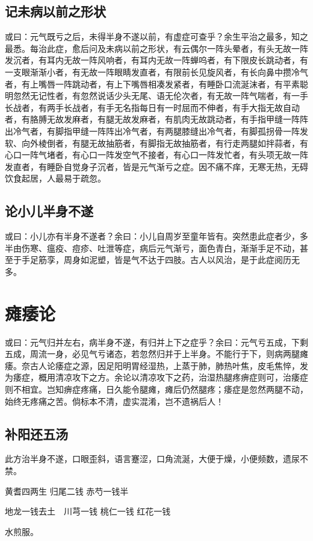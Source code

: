 \documentclass[a4paper,12pt,UTF8,twoside]{ctexbook}
\begin{document}
	\section{记未病以前之形状}
	或曰：元气既亏之后，未得半身不遂以前，有虚症可查乎？余生平治之最多，知之最悉。每治此症，愈后问及未病以前之形状，有云偶尔一阵头晕者，有头无故一阵发沉者，有耳内无故一阵风响者，有耳内无故一阵蝉呜者，有下限皮长跳动者，有一支眼渐渐小者，有无故一阵眼睛发直者，有限前长见旋风者，有长向鼻中攒冷气者，有上嘴唇一阵跳动者，有上下嘴唇相凑发紧者，有睡卧口流涎沫者，有平素聪明忽然无记性者，有忽然说话少头无尾、语无伦次者，有无故一阵气喘者，有一手长战者，有两手长战者，有手无名指每日有一时屈而不伸者，有手大指无故自动者，有胳膊无故发麻者，有腿无故发麻者，有肌肉无故跳动者，有手指甲缝一阵阵出冷气者，有脚指甲缝一阵阵出冷气者，有两腿膝缝出冷气者，有脚孤拐骨一阵发软、向外棱倒者，有腿无故抽筋者，有脚指无故抽筋者，有行走两腿如拌蒜者，有心口一阵气堵者，有心口一阵发空气不接者，有心口一阵发忙者，有头项无故一阵发直者，有睡卧自觉身子沉者，皆是元气渐亏之症。因不痛不痒，无寒无热，无碍饮食起居，人最易于疏忽。
	\section{论小儿半身不遂}
	或曰：小儿亦有半身不遂者？余曰：小儿自周岁至童年皆有。突然患此症者少，多半由伤寒、瘟疫、痘疹、吐泄等症，病后元气渐亏，面色青白，渐渐手足不动，甚至于手足筋孪，周身如泥塑，皆是气不达于四肢。古人以风治，是于此症阅历无多。
	\chapter{瘫痿论}
	或曰：元气归并左右，病半身不遂，有归并上下之症乎？余曰：元气亏五成，下剩五成，周流一身，必见气亏诸态，若忽然归并于上半身。不能行于下，则病两腿瘫痿。奈古人论痿症之源，因足阳明胃经湿热，上蒸于肺，肺热叶焦，皮毛焦悴，发为痿症，概用清凉攻下之方。余论以清凉攻下之药，治湿热腿疼痹症则可，治痿症则不相宜。岂知痹症疼痛，日久能令腿瘫，瘫后仍然腿疼；痿症是忽然两腿不动，始终无疼痛之苦。倘标本不清，虚实混淆，岂不遗祸后人！
	\section{补阳还五汤}
	
	
	此方治半身不遂，口眼歪斜，语言蹇涩，口角流涎，大便于燥，小便频数，遗尿不禁。
	
	黄耆四两生 归尾二钱 赤芍一钱半
	
	地龙一钱去土　川芎一钱 桃仁一钱 红花一钱
	
	水煎服。
	
\end{document}
